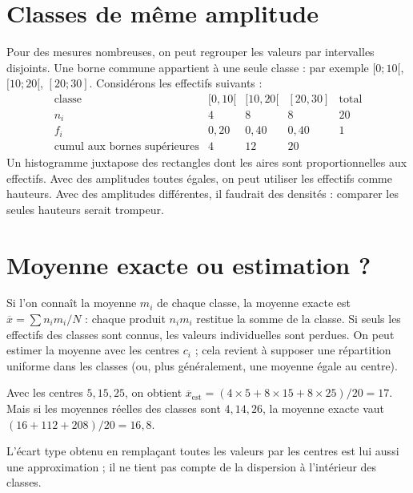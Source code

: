 \documentclass[../cours_2de.tex]{subfiles}
\begin{document}
\section{Classes de même amplitude}
Pour des mesures nombreuses, on peut regrouper les valeurs par intervalles disjoints.
Une borne commune appartient à une seule classe : par exemple $[0;10[$, $[10;20[$, $[20;30]$.
Considérons les effectifs suivants :
\[
\begin{array}{c|ccc|c}
\text{classe}&[0,10[&[10,20[&[20,30]&\text{total}\\\hline
n_i&4&8&8&20\\
f_i&0{,}20&0{,}40&0{,}40&1\\
\text{cumul aux bornes supérieures}&4&12&20&
\end{array}
\]
Un histogramme juxtapose des rectangles dont les aires sont proportionnelles aux effectifs. Avec des amplitudes toutes égales, on peut utiliser les effectifs comme hauteurs. Avec des amplitudes différentes, il faudrait des densités : comparer les seules hauteurs serait trompeur.
\begin{center}
\end{center}
\section{Moyenne exacte ou estimation ?}
Si l'on connaît la moyenne $m_i$ de chaque classe, la moyenne exacte est
$\overline x=\sum n_im_i/N$ : chaque produit $n_im_i$ restitue la somme de la classe.
Si seuls les effectifs des classes sont connus, les valeurs individuelles sont perdues.
On peut estimer la moyenne avec les centres $c_i$ ; cela revient à supposer une répartition uniforme dans les classes (ou, plus généralement, une moyenne égale au centre).
\begin{exemple}
Avec les centres $5,15,25$, on obtient
$\overline x_{\mathrm{est}}=(4\times5+8\times15+8\times25)/20=17$.
Mais si les moyennes réelles des classes sont $4,14,26$, la moyenne exacte vaut
$(16+112+208)/20=16{,}8$.
\end{exemple}
L'écart type obtenu en remplaçant toutes les valeurs par les centres est lui aussi une approximation ; il ne tient pas compte de la dispersion à l'intérieur des classes.
\end{document}
